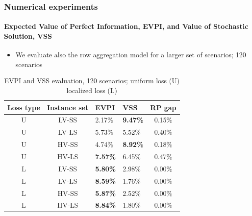 \documentclass[9pt,xcolor={dvipsnames}]{beamer}
\begin{document}
\begin{frame}[allowframebreaks]
	\frametitle{Numerical experiments}
	\framesubtitle{Expected Value of Perfect Information, EVPI, and Value of Stochastic Solution, VSS}	
	\begin{itemize}
		\item We evaluate also the row aggregation model for a larger set of scenarios; 120 scenarios
	\end{itemize}
	\bigskip
	\begin{table}[h!]
		\centering
		\footnotesize
		\begin{tabular}{c c j f c}
			\hline
			Loss type & Instance set & EVPI & VSS & RP gap \\
			\hline
			U & LV-SS & 2.17\% & \textbf{9.47\%} & 0.15\% \\
			U & LV-LS & 5.73\% & 5.52\% & 0.40\% \\
   
			U & HV-SS & 4.74\% & \textbf{8.92\%} & 0.18\% \\
			U & HV-LS & \textbf{7.57\%} & 6.45\% & 0.47\% \\
			\hline
			L & LV-SS & \textbf{5.80\%} & 2.98\% & 0.00\% \\
			L & LV-LS & \textbf{8.59\%} & 1.76\% & 0.00\% \\
   
			L & HV-SS & \textbf{5.87\%} & 2.52\% & 0.00\% \\
			L & HV-LS & \textbf{8.84\%} & 1.80\% & 0.00\% \\
			\hline
		\end{tabular}
		\caption{EVPI and VSS evaluation, 120 scenarios; uniform loss (U) localized loss (L)}
		\label{tab:optres3}
	\end{table}
\end{frame}
\end{document}
